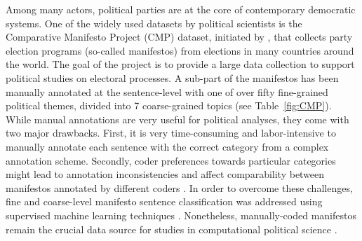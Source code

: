 \documentclass[11pt,a4paper]{article}
\newcommand{\tabref}[2][]{Table#1~\ref{#2}\xspace}
\begin{document}


Among many actors, political parties are at the core of contemporary democratic systems. One of the widely used datasets by political scientists is the Comparative
Manifesto Project (CMP) dataset, initiated by , that collects party election programs (so-called manifestos) from elections in many countries around the world. The goal of the project is to provide a large data collection to support political studies on electoral processes. A sub-part of the manifestos has been manually annotated at the sentence-level with one of over fifty fine-grained political themes, divided into 7 coarse-grained topics (see \tabref{fig:CMP}).  While manual annotations are very useful for political analyses, they come with two major drawbacks. First, it is very time-consuming and labor-intensive to manually annotate each sentence with the correct category from a complex annotation scheme. Secondly, coder preferences towards particular categories might lead to annotation inconsistencies and affect comparability between manifestos annotated by different coders \cite{coder}. In order to overcome these challenges, fine and coarse-level manifesto sentence classification was addressed using supervised machine learning techniques \cite{verberne2014automatic, zirn2016classifying}. Nonetheless, manually-coded manifestos remain the crucial data source for studies in computational political science \cite{lowe2011scaling, nanni}. 
\end{document}
